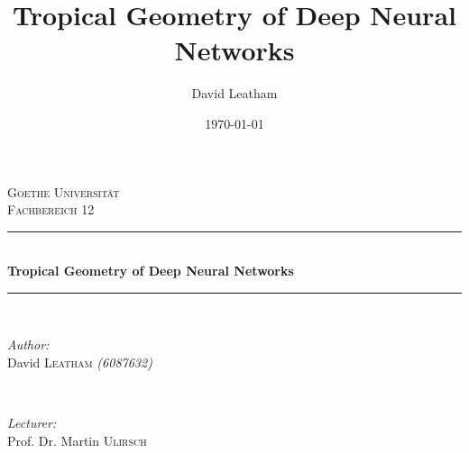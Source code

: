 \documentclass{article}
\title{Tropical Geometry of Deep Neural Networks}
\author{David Leatham}
\date{\today}
\theoremstyle{definition}
\begin{document}
\begin{titlepage}

\newcommand{\HRule}{\rule{\linewidth}{0.5mm}} %

\center %
 

\textsc{\LARGE Goethe Universität}\\[1.5cm] %
\textsc{\Large Fachbereich 12}\\[0.5cm] %


\HRule \\[0.4cm]
{ \huge \bfseries Tropical Geometry of Deep Neural Networks}\\[0.4cm] %
\HRule \\[1.5cm]
 

\begin{minipage}{0.4\textwidth}
\begin{flushleft} \large
\emph{Author:}\\
David \textsc{Leatham} \textit{(6087632)} \\
\end{flushleft}
\end{minipage}
~
\begin{minipage}{0.4\textwidth}
\begin{flushright} \large
\emph{Lecturer:} \\
Prof. Dr. Martin \textsc{Ulirsch} \\
\end{flushright}
\end{minipage}\\[2cm]


\end{titlepage}
\end{document}
